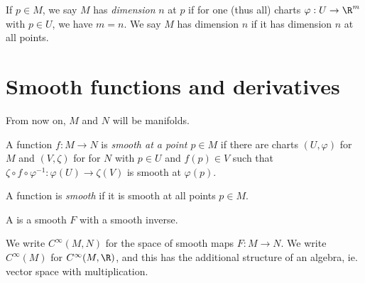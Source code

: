 \documentclass[a4paper]{article}
\begin{document}
\begin{defi}[Dimension]
  If $p \in M$, we say $M$ has \emph{dimension} $n$ at $p$ if for one (thus all) charts $\varphi: U \to \R^m$ with $p \in U$, we have $m = n$. We say $M$ has dimension $n$ if it has dimension $n$ at all points.
\end{defi}

\section{Smooth functions and derivatives}
From now on, $M$ and $N$ will be manifolds.

\begin{defi}
  A function $f: M \to N$ is \emph{smooth at a point $p \in M$} if there are charts $(U, \varphi)$ for $M$ and $(V, \zeta)$ for for $N$ with $p \in U$ and $f(p) \in V$ such that $\zeta \circ f \circ \varphi^{-1}: \varphi(U) \to \zeta(V)$ is smooth at $\varphi(p)$.

  A function is \emph{smooth} if it is smooth at all points $p \in M$.

  A  is a smooth $F$ with a smooth inverse.

  We write $C^\infty(M, N)$  for the space of smooth maps $F: M \to N$. We write $C^\infty(M)$ for $C^\infty(M, \R)$, and this has the additional structure of an algebra, ie. vector space with multiplication.
\end{defi}
\end{document}
